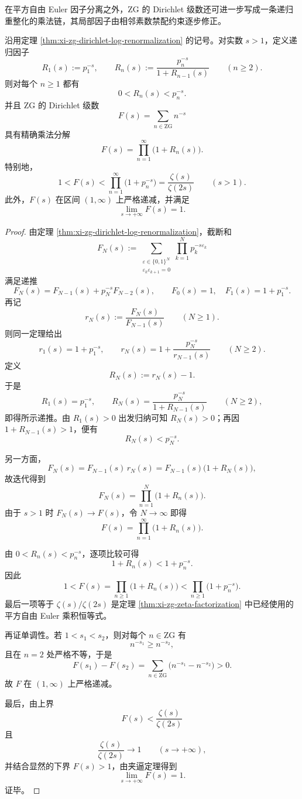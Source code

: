 在平方自由 Euler 因子分离之外，\(\mathrm{ZG}\) 的 Dirichlet 级数还可进一步写成一条递归重整化的乘法链，其局部因子由相邻素数禁配约束逐步修正。

\begin{theorem}\label{thm:xi-zg-continued-euler-factorization}
沿用定理 \ref{thm:xi-zg-dirichlet-log-renormalization} 的记号。对实数 \(s>1\)，定义递归因子
\[
R_1(s):=p_1^{-s},
\qquad
R_n(s):=\frac{p_n^{-s}}{1+R_{n-1}(s)}
\qquad(n\ge 2).
\]
则对每个 \(n\ge 1\) 都有
\[
\boxed{\;
0<R_n(s)<p_n^{-s}.\;}
\]
并且 \(\mathrm{ZG}\) 的 Dirichlet 级数
\[
F(s)=\sum_{n\in \mathrm{ZG}}n^{-s}
\]
具有精确乘法分解
\[
\boxed{\;
F(s)=\prod_{n=1}^{\infty}\bigl(1+R_n(s)\bigr).\;}
\]
特别地，
\[
\boxed{\;
1<F(s)<\prod_{n=1}^{\infty}\bigl(1+p_n^{-s}\bigr)=\frac{\zeta(s)}{\zeta(2s)}
\qquad(s>1).\;}
\]
此外，\(F(s)\) 在区间 \((1,\infty)\) 上严格递减，并满足
\[
\boxed{\;
\lim_{s\to+\infty}F(s)=1.\;}
\]
\end{theorem}
\begin{proof}
由定理 \ref{thm:xi-zg-dirichlet-log-renormalization}，截断和
\[
F_N(s):=\sum_{\substack{\varepsilon\in\{0,1\}^N\\ \varepsilon_k\varepsilon_{k+1}=0}}
\prod_{k=1}^{N}p_k^{-s\varepsilon_k}
\]
满足递推
\[
F_N(s)=F_{N-1}(s)+p_N^{-s}F_{N-2}(s),
\qquad
F_0(s)=1,\quad F_1(s)=1+p_1^{-s}.
\]
再记
\[
r_N(s):=\frac{F_N(s)}{F_{N-1}(s)}
\qquad(N\ge 1).
\]
则同一定理给出
\[
r_1(s)=1+p_1^{-s},
\qquad
r_N(s)=1+\frac{p_N^{-s}}{r_{N-1}(s)}
\qquad(N\ge 2).
\]
定义
\[
R_N(s):=r_N(s)-1.
\]
于是
\[
R_1(s)=p_1^{-s},
\qquad
R_N(s)=\frac{p_N^{-s}}{1+R_{N-1}(s)}
\qquad(N\ge 2),
\]
即得所示递推。由 \(R_1(s)>0\) 出发归纳可知 \(R_N(s)>0\)；再因 \(1+R_{N-1}(s)>1\)，便有
\[
R_N(s)<p_N^{-s}.
\]

另一方面，
\[
F_N(s)=F_{N-1}(s)\,r_N(s)=F_{N-1}(s)\bigl(1+R_N(s)\bigr),
\]
故迭代得到
\[
F_N(s)=\prod_{n=1}^{N}\bigl(1+R_n(s)\bigr).
\]
由于 \(s>1\) 时 \(F_N(s)\to F(s)\)，令 \(N\to\infty\) 即得
\[
F(s)=\prod_{n=1}^{\infty}\bigl(1+R_n(s)\bigr).
\]

由 \(0<R_n(s)<p_n^{-s}\)，逐项比较可得
\[
1+R_n(s)<1+p_n^{-s}.
\]
因此
\[
1<F(s)=\prod_{n\ge 1}\bigl(1+R_n(s)\bigr)
<
\prod_{n\ge 1}\bigl(1+p_n^{-s}\bigr).
\]
最后一项等于 \(\zeta(s)/\zeta(2s)\) 是定理 \ref{thm:xi-zg-zeta-factorization} 中已经使用的平方自由 Euler 乘积恒等式。

再证单调性。若 \(1<s_1<s_2\)，则对每个 \(n\in\mathrm{ZG}\) 有
\[
n^{-s_1}\ge n^{-s_2},
\]
且在 \(n=2\) 处严格不等，于是
\[
F(s_1)-F(s_2)
=
\sum_{n\in\mathrm{ZG}}\bigl(n^{-s_1}-n^{-s_2}\bigr)>0.
\]
故 \(F\) 在 \((1,\infty)\) 上严格递减。

最后，由上界
\[
F(s)<\frac{\zeta(s)}{\zeta(2s)}
\]
且
\[
\frac{\zeta(s)}{\zeta(2s)}\longrightarrow 1
\qquad(s\to+\infty),
\]
并结合显然的下界 \(F(s)>1\)，由夹逼定理得到
\[
\lim_{s\to+\infty}F(s)=1.
\]
证毕。
\end{proof}
